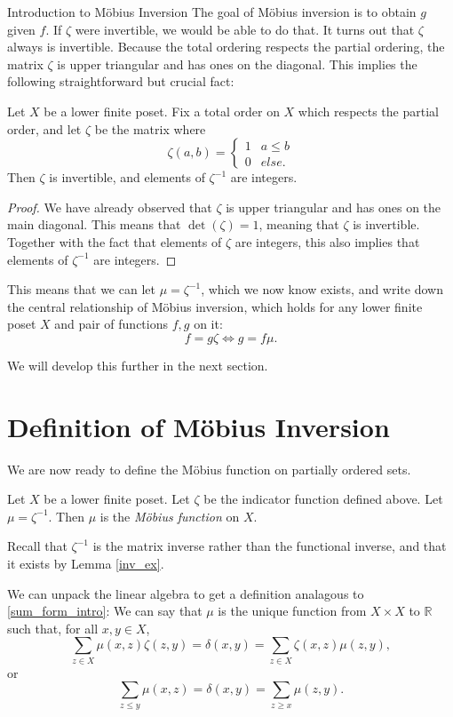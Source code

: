 \documentclass[12pt]{pom_thesis}
\newcommand{\Rr}{\mathbb{R}}
\begin{document}
\begin{chapter}{Introduction to M\"obius Inversion}
The goal of M\"obius inversion is to obtain $g$ given $f$. If $\zeta$ were invertible, we would be able to do that. It turns out that $\zeta$ always is invertible. Because the total ordering respects the partial ordering, the matrix $\zeta$ is upper triangular and has ones on the diagonal. This implies the following straightforward but crucial fact:
\begin{lemma}\label{inv_ex}
Let $X$ be a lower finite poset. Fix a total order on $X$ which respects the partial order, and let $\zeta$ be the matrix where 
\[
\zeta(a,b) = \begin{cases}1 & a \leq b \\ 0 & else. \end{cases}
\]
Then $\zeta$ is invertible, and elements of $\zeta^{-1}$ are integers.
\end{lemma}
\begin{proof}
We have already observed that $\zeta$ is upper triangular and has ones on the main diagonal. This means that $\det(\zeta) = 1$, meaning that $\zeta$ is invertible. Together with the fact that elements of $\zeta$ are integers, this also implies that elements of $\zeta^{-1}$ are integers.
\end{proof}

This means that we can let $\mu=\zeta^{-1}$, which we now know exists, and write down the central relationship of M\"obius inversion, which holds for any lower finite poset $X$ and pair of functions $f,g$ on it:
\[
f = g \zeta \iff g = f \mu.
\]

We will develop this further in the next section.

\section{Definition of M\"obius Inversion}
We are now ready to define the M\"obius function on partially ordered sets.
\begin{defn}\label{def_mob_pos}
Let $X$ be a lower finite poset. Let $\zeta$ be the indicator function defined above. Let $\mu = \zeta^{-1}$. Then $\mu$ is the \emph{M\"obius function} on $X$.
\end{defn}
\begin{rmk}
Recall that $\zeta^{-1}$ is the matrix inverse rather than the functional inverse, and that it exists by Lemma \ref{inv_ex}.
\end{rmk}
\begin{rmk}\label{sum_form}
We can unpack the linear algebra to get a definition analagous to \eqref{sum_form_intro}: We can say that $\mu$ is the unique function from $X\times X$ to $\Rr$ such that, for all $x,y \in X$,
\[
\sum_{z \in X} \mu(x,z)\zeta(z,y) = \delta(x,y) = \sum_{z \in X} \zeta(x,z)\mu(z,y),
\]
or
\[
\sum_{z \leq y} \mu(x,z) = \delta(x,y) = \sum_{z \geq x} \mu(z,y).
\]
\end{rmk}


\end{chapter}
\end{document}
